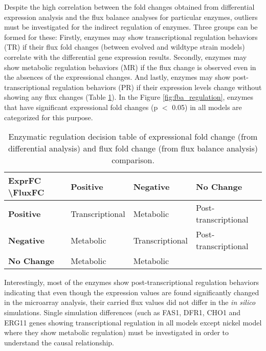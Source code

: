 Despite the high correlation between the fold changes obtained from differential expression analysis and the flux balance analyses for particular enzymes, outliers must be investigated for the indirect regulation of enzymes. Three groups can be formed for these: Firstly, enzymes may show transcriptional regulation behaviors (TR) if their flux fold changes (between evolved and wildtype strain models) correlate with the differential gene expression results. Secondly, enzymes may show metabolic regulation behaviors (MR) if the flux change is observed even in the absences of the expressional changes. And lastly, enzymes may show post-transcriptional regulation behaviors (PR) if their expression levels change without showing any flux changes (Table \ref{table:regulation_table}). In the Figure \ref{fig:fba_regulation}, enzymes that have significant expressional fold changes (p $<$ 0.05) in all models are categorized for this purpose.

\baselineskip
\begin{table}[H]
\begin{center}
\caption[Enzymatic regulation decision table of expressional fold change (from differential analysis) and flux fold change (from flux balance analysis) comparison.]{Enzymatic regulation decision table of expressional fold change (from differential analysis) and flux fold change (from flux balance analysis) comparison.}
\baselineskip
\label{table:regulation_table}
\begin{tabular}{l|l|l|l|}
\cline{2-4}
\textbf{ExprFC \textbackslash FluxFC} & \textbf{Positive} & \textbf{Negative} & \textbf{No Change} \\ \hline
\multicolumn{1}{|l|}{\textbf{Positive}}  & Transcriptional & Metabolic       & Post-transcriptional \\ \hline
\multicolumn{1}{|l|}{\textbf{Negative}}  & Metabolic       & Transcriptional & Post-transcriptional \\ \hline
\multicolumn{1}{|l|}{\textbf{No Change}} & Metabolic       & Metabolic       &                      \\ \hline
\end{tabular}
\end{center}
\end{table}

Interestingly, most of the enzymes show post-transcriptional regulation behaviors indicating that even though the expression values are found significantly changed in the microarray analysis, their carried flux values did not differ in the \emph{in silico} simulations. Single simulation differences (such as FAS1, DFR1, CHO1 and ERG11 genes showing transcriptional regulation in all models except nickel model where they show metabolic regulation) must be investigated in order to understand the causal relationship.

